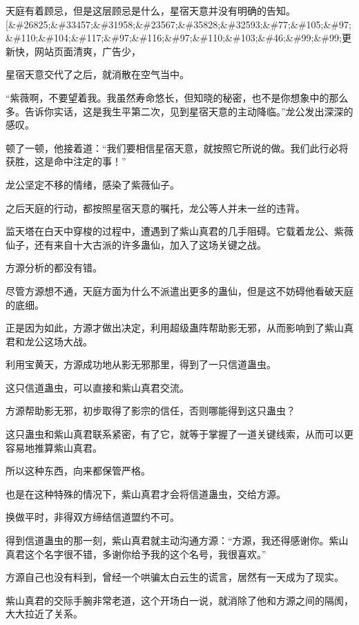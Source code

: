 
\begin{this_body}

天庭有着顾忌，但是这层顾忌是什么，星宿天意并没有明确的告知。[\&\#26825;\&\#33457;\&\#31958;\&\#23567;\&\#35828;\&\#32593;\&\#77;\&\#105;\&\#97;\&\#110;\&\#104;\&\#117;\&\#97;\&\#116;\&\#97;\&\#110;\&\#103;\&\#46;\&\#99;\&\#99;更新快，网站页面清爽，广告少，

星宿天意交代了之后，就消散在空气当中。

“紫薇啊，不要望着我。我虽然寿命悠长，但知晓的秘密，也不是你想象中的那么多。告诉你实话，这是我生平第二次，见到星宿天意的主动降临。”龙公发出深深的感叹。

顿了一顿，他接着道：“我们要相信星宿天意，就按照它所说的做。我们此行必将获胜，这是命中注定的事！”

龙公坚定不移的情绪，感染了紫薇仙子。

之后天庭的行动，都按照星宿天意的嘱托，龙公等人并未一丝的违背。

监天塔在白天中穿梭的过程中，遭遇到了紫山真君的几手阻碍。它载着龙公、紫薇仙子，还有来自十大古派的许多蛊仙，加入了这场关键之战。

方源分析的都没有错。

尽管方源想不通，天庭方面为什么不派遣出更多的蛊仙，但是这不妨碍他看破天庭的底细。

正是因为如此，方源才做出决定，利用超级蛊阵帮助影无邪，从而影响到了紫山真君和龙公这场大战。

利用宝黄天，方源成功地从影无邪那里，得到了一只信道蛊虫。

这只信道蛊虫，可以直接和紫山真君交流。

方源帮助影无邪，初步取得了影宗的信任，否则哪能得到这只蛊虫？

这只蛊虫和紫山真君联系紧密，有了它，就等于掌握了一道关键线索，从而可以更容易地推算紫山真君。

所以这种东西，向来都保管严格。

也是在这种特殊的情况下，紫山真君才会将信道蛊虫，交给方源。

换做平时，非得双方缔结信道盟约不可。

得到信道蛊虫的那一刻，紫山真君就主动沟通方源：“方源，我还得感谢你。紫山真君这个名字很不错，多谢你给予我的这个名号，我很喜欢。”

方源自己也没有料到，曾经一个哄骗太白云生的谎言，居然有一天成为了现实。

紫山真君的交际手腕非常老道，这个开场白一说，就消除了他和方源之间的隔阂，大大拉近了关系。


\end{this_body}
